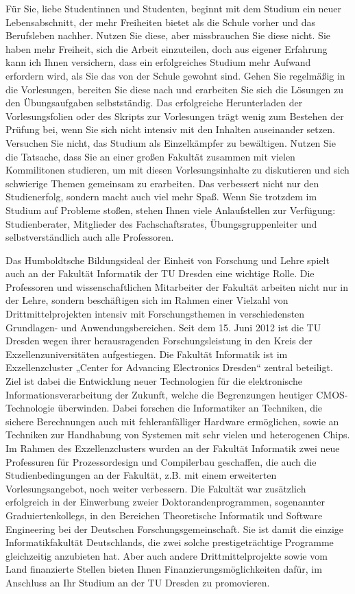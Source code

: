 Für Sie, liebe Studentinnen und Studenten, beginnt mit dem Studium ein neuer Lebensabschnitt, der mehr Freiheiten bietet als die Schule vorher und das Berufsleben nachher. Nutzen Sie diese, aber missbrauchen Sie diese nicht. Sie haben mehr Freiheit, sich die Arbeit einzuteilen, doch aus eigener Erfahrung kann ich Ihnen versichern, dass ein erfolgreiches Studium mehr Aufwand erfordern wird, als Sie das von der Schule gewohnt sind. Gehen Sie regelmäßig in die Vorlesungen, bereiten Sie diese nach und erarbeiten Sie sich die Lösungen zu den Übungsaufgaben selbstständig. Das erfolgreiche Herunterladen der Vorlesungsfolien oder des Skripts zur Vorlesungen trägt wenig zum Bestehen der Prüfung bei, wenn Sie sich nicht intensiv mit den Inhalten auseinander setzen. Versuchen Sie nicht, das Studium als Einzelkämpfer zu bewältigen. Nutzen Sie die Tatsache, dass Sie an einer großen Fakultät zusammen mit vielen Kommilitonen studieren, um mit diesen Vorlesungsinhalte zu diskutieren und sich schwierige Themen gemeinsam zu erarbeiten. Das verbessert nicht nur den Studienerfolg, sondern macht auch viel mehr Spaß. Wenn Sie trotzdem im Studium auf Probleme stoßen, stehen Ihnen viele Anlaufstellen zur Verfügung: Studienberater, Mitglieder des Fachschaftsrates, Übungsgruppenleiter und selbstverständlich auch alle Professoren. 

Das Humboldtsche Bildungsideal der Einheit von Forschung und Lehre spielt auch an der Fakultät Informatik der TU Dresden eine wichtige Rolle. Die Professoren und wissenschaftlichen Mitarbeiter der Fakultät arbeiten nicht nur in der Lehre, sondern beschäftigen sich im Rahmen einer Vielzahl von Drittmittelprojekten intensiv mit Forschungsthemen in verschiedensten Grundlagen- und Anwendungsbereichen. Seit dem 15. Juni 2012 ist die TU Dresden wegen ihrer herausragenden Forschungsleistung in den Kreis der Exzellenzuniversitäten aufgestiegen.  Die Fakultät Informatik ist im Exzellenzcluster „Center for Advancing Electronics Dresden“  zentral beteiligt. Ziel ist dabei die Entwicklung neuer Technologien für die elektronische Informationsverarbeitung der Zukunft,  welche die Begrenzungen heutiger CMOS-Technologie überwinden. Dabei forschen die Informatiker an Techniken, die sichere Berechnungen auch mit fehleranfälliger Hardware ermöglichen, sowie an Techniken zur Handhabung von Systemen mit sehr vielen und heterogenen Chips.  Im Rahmen des Exzellenzclusters wurden an der Fakultät Informatik zwei neue Professuren für Prozessordesign und Compilerbau geschaffen, die auch die Studienbedingungen an der Fakultät, z.B. mit einem erweiterten Vorlesungsangebot, noch weiter verbessern. Die Fakultät war zusätzlich erfolgreich in der Einwerbung zweier Doktorandenprogrammen, sogenannter Graduiertenkollegs, in den Bereichen Theoretische Informatik und Software Engineering bei der Deutschen Forschungsgemeinschaft. Sie ist damit die einzige Informatikfakultät Deutschlands, die zwei solche prestigeträchtige Programme gleichzeitig anzubieten hat. Aber auch andere Drittmittelprojekte sowie vom Land finanzierte Stellen bieten Ihnen Finanzierungsmöglichkeiten dafür, im Anschluss an Ihr Studium an der TU Dresden zu promovieren.

